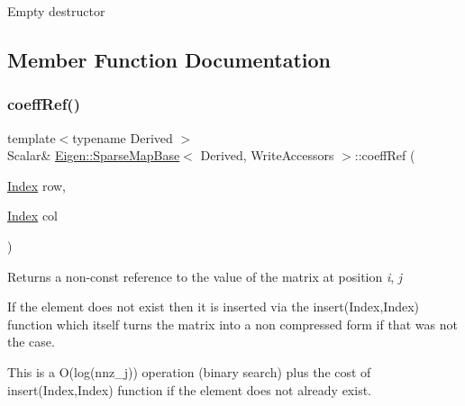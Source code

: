 Empty destructor 

\subsection{Member Function Documentation}
\mbox{\label{class_eigen_1_1_sparse_map_base_3_01_derived_00_01_write_accessors_01_4_aa9c42d48b9dd6f947ce3c257fe4bf2ca}} 
\subsubsection{\texorpdfstring{coeffRef()}{coeffRef()}}
{\footnotesize\ttfamily template$<$typename Derived $>$ \\
Scalar\& \mbox{\hyperlink{class_eigen_1_1_sparse_map_base}{Eigen\+::\+Sparse\+Map\+Base}}$<$ Derived, Write\+Accessors $>$\+::coeff\+Ref (\begin{DoxyParamCaption}\item[{\mbox{\hyperlink{struct_eigen_1_1_eigen_base_a554f30542cc2316add4b1ea0a492ff02}{Index}}}]{row,  }\item[{\mbox{\hyperlink{struct_eigen_1_1_eigen_base_a554f30542cc2316add4b1ea0a492ff02}{Index}}}]{col }\end{DoxyParamCaption})\hspace{0.3cm}{\ttfamily [inline]}}





\begin{DoxyReturn}{Returns}
a non-\/const reference to the value of the matrix at position {\itshape i}, {\itshape j} 
\end{DoxyReturn}
If the element does not exist then it is inserted via the insert(\+Index,\+Index) function which itself turns the matrix into a non compressed form if that was not the case.

This is a O(log(nnz\+\_\+j)) operation (binary search) plus the cost of insert(\+Index,\+Index) function if the element does not already exist. \mbox{\label{class_eigen_1_1_sparse_map_base_3_01_derived_00_01_write_accessors_01_4_af5cd1f13dde8578eb9891a4ac4a11977}} 
